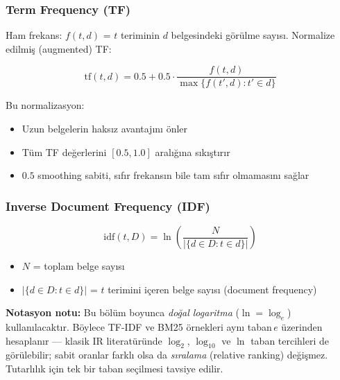 \subsubsection{Term Frequency (TF)}

Ham frekans: $f(t,d)$ = $t$ teriminin $d$ belgesindeki g\"{o}r\"{u}lme say{\i}s{\i}. Normalize edilmi\c{s} (augmented) TF:

\begin{formulbox}
\begin{equation}
\text{tf}(t, d) = 0.5 + 0.5 \cdot \frac{f(t, d)}{\max\{f(t', d) : t' \in d\}}
\label{eq:tf}
\end{equation}

Bu normalizasyon:
\begin{itemize}
  \item Uzun belgelerin haks{\i}z avantaj{\i}n{\i} \"{o}nler
  \item T\"{u}m TF de\u{g}erlerini $[0.5, 1.0]$ aral{\i}\u{g}{\i}na s{\i}k{\i}\c{s}t{\i}r{\i}r
  \item $0.5$ smoothing sabiti, s{\i}f{\i}r frekans{\i}n bile tam s{\i}f{\i}r olmamas{\i}n{\i} sa\u{g}lar
\end{itemize}
\end{formulbox}

\subsubsection{Inverse Document Frequency (IDF)}

\begin{formulbox}
\begin{equation}
\text{idf}(t, D) = \ln\!\left(\frac{N}{|\{d \in D : t \in d\}|}\right)
\label{eq:idf}
\end{equation}

\begin{itemize}
  \item $N$ = toplam belge say{\i}s{\i}
  \item $|\{d \in D : t \in d\}|$ = $t$ terimini i\c{c}eren belge say{\i}s{\i} (document frequency)
\end{itemize}
\textbf{Notasyon notu:} Bu b\"{o}l\"{u}m boyunca \emph{do\u{g}al logaritma} ($\ln = \log_e$) kullan{\i}lacakt{\i}r. B\"{o}ylece TF-IDF ve BM25 \"{o}rnekleri ayn{\i} taban\,$e$ \"{u}zerinden hesaplan{\i}r --- klasik IR literat\"{u}r\"{u}nde $\log_2$, $\log_{10}$ ve $\ln$ taban tercihleri de g\"{o}r\"{u}lebilir; sabit oranlar farkl{\i} olsa da \emph{s{\i}ralama} (relative ranking) de\u{g}i\c{s}mez. Tutarl{\i}l{\i}k i\c{c}in tek bir taban se\c{c}ilmesi tavsiye edilir.
\end{formulbox}


